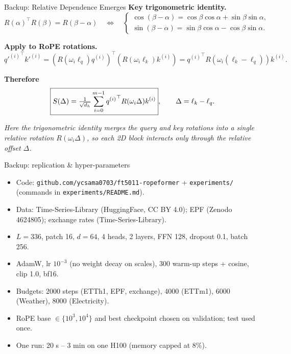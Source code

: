 \documentclass[aspectratio=169,xcolor=dvipsnames]{beamer}
\begin{document}
\begin{frame}{Backup: Relative Dependence Emerges}
\footnotesize
\textbf{Key trigonometric identity.}
\[
R(\alpha)^\top R(\beta)=R(\beta-\alpha)
\quad\Longleftrightarrow\quad
\begin{cases}
\cos(\beta-\alpha)=\cos\beta\cos\alpha+\sin\beta\sin\alpha,\\[3pt]
\sin(\beta-\alpha)=\sin\beta\cos\alpha-\cos\beta\sin\alpha.
\end{cases}
\]

\textbf{Apply to RoPE rotations.}
\[
{q'^{(i)}}^\top k'^{(i)}
=(R(\omega_i \ell_q)q^{(i)})^\top (R(\omega_i \ell_k)k^{(i)})
={q^{(i)}}^\top R(\omega_i(\ell_k-\ell_q))k^{(i)}.
\]

\textbf{Therefore}
\[
\boxed{%
S(\Delta)=\tfrac{1}{\sqrt{d_h}}
\sum_{i=0}^{m-1}{q^{(i)}}^\top R(\omega_i\Delta)k^{(i)}},
\qquad
\Delta=\ell_k-\ell_q.
\]

\textit{Here the trigonometric identity merges the query and key rotations 
into a single relative rotation $R(\omega_i\Delta)$, 
so each 2D block interacts only through the relative offset $\Delta$.}
\end{frame}

\begin{frame}{Backup: replication \& hyper-parameters}
\small
\begin{itemize}
\item Code: \texttt{github.com/ycsama0703/ft5011-ropeformer} + \texttt{experiments/} (commands in \texttt{experiments/README.md}).
\item Data: Time-Series-Library (HuggingFace, CC BY 4.0); EPF (Zenodo 4624805); exchange rates (Time-Series-Library).
\item $L=336$, patch 16, $d=64$, 4 heads, 2 layers, FFN 128, dropout 0.1, batch 256.
\item AdamW, lr $10^{-3}$ (no weight decay on scales), 300 warm-up steps + cosine, clip 1.0, bf16.
\item Budgets: 2000 steps (ETTh1, EPF, exchange), 4000 (ETTm1), 6000 (Weather), 8000 (Electricity).
\item RoPE base $\in\{10^3,10^4\}$ and best checkpoint chosen on validation; test used once.
\item One run: 20 s -- 3 min on one H100 (memory capped at 8\%).
\end{itemize}
\end{frame}
\end{document}
